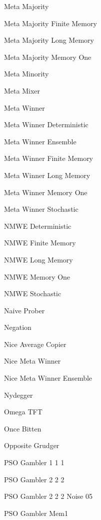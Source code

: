 \item Meta Majority~\cite{axelrodproject}
\item Meta Majority Finite Memory~\cite{axelrodproject}
\item Meta Majority Long Memory~\cite{axelrodproject}
\item Meta Majority Memory One~\cite{axelrodproject}
\item Meta Minority~\cite{axelrodproject}
\item Meta Mixer~\cite{axelrodproject}
\item Meta Winner~\cite{axelrodproject}
\item Meta Winner Deterministic~\cite{axelrodproject}
\item Meta Winner Ensemble~\cite{axelrodproject}
\item Meta Winner Finite Memory~\cite{axelrodproject}
\item Meta Winner Long Memory~\cite{axelrodproject}
\item Meta Winner Memory One~\cite{axelrodproject}
\item Meta Winner Stochastic~\cite{axelrodproject}
\item NMWE Deterministic~\cite{axelrodproject}
\item NMWE Finite Memory~\cite{axelrodproject}
\item NMWE Long Memory~\cite{axelrodproject}
\item NMWE Memory One~\cite{axelrodproject}
\item NMWE Stochastic~\cite{axelrodproject}
\item Naive Prober~\cite{Li2011}
\item Negation~\cite{PD2017}
\item Nice Average Copier~\cite{axelrodproject}
\item Nice Meta Winner~\cite{axelrodproject}
\item Nice Meta Winner Ensemble~\cite{axelrodproject}
\item Nydegger~\cite{Axelrod1980a}
\item Omega TFT~\cite{kendall2007iterated}
\item Once Bitten~\cite{axelrodproject}
\item Opposite Grudger~\cite{axelrodproject}
\item PSO Gambler 1 1 1~\cite{axelrodproject}
\item PSO Gambler 2 2 2~\cite{axelrodproject}
\item PSO Gambler 2 2 2 Noise 05~\cite{axelrodproject}
\item PSO Gambler Mem1 \cite{axelrodproject}

